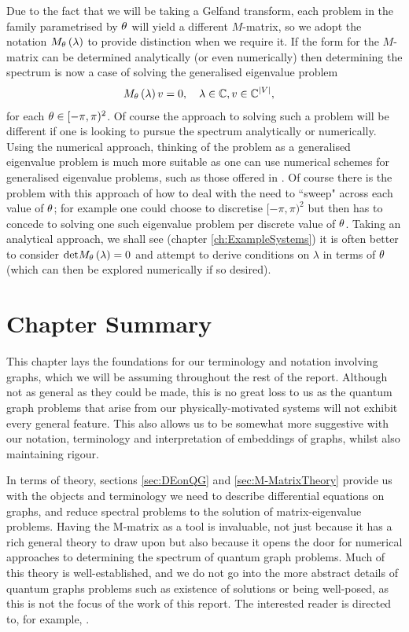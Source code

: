 Due to the fact that we will be taking a Gelfand transform, each problem in the family parametrised by $\theta$ will yield a different $M$-matrix, so we adopt the notation $M_{\theta}\left( \lambda \right)$ to provide distinction when we require it.
If the form for the $M$-matrix can be determined analytically (or even numerically) then determining the spectrum is now a case of solving the generalised eigenvalue problem
\begin{align} \label{eq:M-MatrixEvalProb}
	M_{\theta}\left( \lambda \right)v &= 0, \quad \lambda\in\mathbb{C}, v\in\mathbb{C}^{\left\lvert V \right\rvert},
\end{align}
for each $\theta\in[-\pi,\pi)^2$.
Of course the approach to solving such a problem will be different if one is looking to pursue the spectrum analytically or numerically.
Using the numerical approach, thinking of the problem as a generalised eigenvalue problem is much more suitable as one can use numerical schemes for generalised eigenvalue problems, such as those offered in \cite{guttel2017nonlinear}.
Of course there is the problem with this approach of how to deal with the need to ``sweep" across each value of $\theta$; for example one could choose to discretise $[-\pi,\pi)^2$ but then has to concede to solving one such eigenvalue problem per discrete value of $\theta$.
Taking an analytical approach, we shall see (chapter \ref{ch:ExampleSystems}) it is often better to consider $\mathrm{det}M_{\theta}\left( \lambda \right) = 0$ and attempt to derive conditions on $\lambda$ in terms of $\theta$ (which can then be explored numerically if so desired).

\section{Chapter Summary} \label{sec:QGSummary}
This chapter lays the foundations for our terminology and notation involving graphs, which we will be assuming throughout the rest of the report.
Although not as general as they could be made, this is no great loss to us as the quantum graph problems that arise from our physically-motivated systems will not exhibit every general feature.
This also allows us to be somewhat more suggestive with our notation, terminology and interpretation of embeddings of graphs, whilst also maintaining rigour. \newline

In terms of theory, sections \ref{sec:DEonQG} and \ref{sec:M-MatrixTheory} provide us with the objects and terminology we need to describe differential equations on graphs, and reduce spectral problems to the solution of matrix-eigenvalue problems.
Having the M-matrix as a tool is invaluable, not just because it has a rich general theory to draw upon  but also because it opens the door for numerical approaches to determining the spectrum of quantum graph problems.
Much of this theory is well-established, and we do not go into the more abstract details of quantum graphs problems such as existence of solutions or being well-posed, as this is not the focus of the work of this report.
The interested reader is directed to, for example, . \newline

